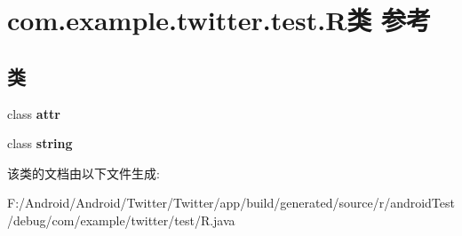 \hypertarget{classcom_1_1example_1_1twitter_1_1test_1_1_r}{}\section{com.\+example.\+twitter.\+test.\+R类 参考}
\label{classcom_1_1example_1_1twitter_1_1test_1_1_r}
\subsection*{类}
\begin{DoxyCompactItemize}
\item 
class {\bfseries attr}
\item 
class {\bfseries string}
\end{DoxyCompactItemize}


该类的文档由以下文件生成\+:\begin{DoxyCompactItemize}
\item 
F\+:/\+Android/\+Android/\+Twitter/\+Twitter/app/build/generated/source/r/android\+Test/debug/com/example/twitter/test/R.\+java\end{DoxyCompactItemize}
